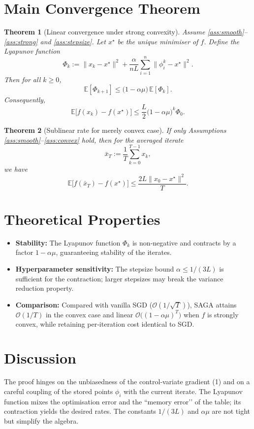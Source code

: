 \documentclass{article}
\newtheorem{theorem}{Theorem}
\newcommand{\E}{\mathbb{E}}
\begin{document}
\section*{Main Convergence Theorem}
\begin{theorem}[Linear convergence under strong convexity]\label{thm:linear}
Assume \ref{ass:smooth}–\ref{ass:strong} and \ref{ass:stepsize}.  
Let $x^\star$ be the unique minimiser of $f$. Define the Lyapunov function
\[
\Phi_k:=\|x_k-x^\star\|^{2}+\frac{\alpha}{nL}\sum_{i=1}^{n}\|\phi_i^{k}-x^\star\|^{2}.
\]
Then for all $k\ge0$,
\[
\E[\Phi_{k+1}]\le\bigl(1-\alpha\mu\bigr)\,\E[\Phi_k].
\tag{4}
\]
Consequently,
\[
\E\bigl[f(x_k)-f(x^\star)\bigr]\le \frac{L}{2}\bigl(1-\alpha\mu\bigr)^{k}\Phi_0 .
\tag{5}
\]
\end{theorem}
\begin{theorem}[Sublinear rate for merely convex case]\label{thm:sublinear}
If only Assumptions \ref{ass:smooth}–\ref{ass:convex} hold, then for the averaged iterate
\[
\bar x_T:=\frac{1}{T}\sum_{k=0}^{T-1}x_k,
\]
we have
\[
\E\bigl[f(\bar x_T)-f(x^\star)\bigr]\le\frac{2L\|x_0-x^\star\|^{2}}{T}.
\tag{6}
\]
\end{theorem}

\section*{Theoretical Properties}
\begin{itemize}
\item \textbf{Stability:} The Lyapunov function $\Phi_k$ is non‑negative and contracts by a factor $1-\alpha\mu$, guaranteeing stability of the iterates.
\item \textbf{Hyperparameter sensitivity:} The stepsize bound $\alpha\le 1/(3L)$ is sufficient for the contraction; larger stepsizes may break the variance reduction property.
\item \textbf{Comparison:} Compared with vanilla SGD ($\mathcal{O}(1/\sqrt{T})$), SAGA attains $\mathcal{O}(1/T)$ in the convex case and linear $\mathcal{O}\bigl((1-\alpha\mu)^T\bigr)$ when $f$ is strongly convex, while retaining per‑iteration cost identical to SGD.
\end{itemize}

\section*{Discussion}
The proof hinges on the unbiasedness of the control‑variate gradient (1) and on a careful coupling of the stored points $\phi_i$ with the current iterate. The Lyapunov function mixes the optimisation error and the “memory error’’ of the table; its contraction yields the desired rates. The constants $1/(3L)$ and $\alpha\mu$ are not tight but simplify the algebra.
\end{document}
